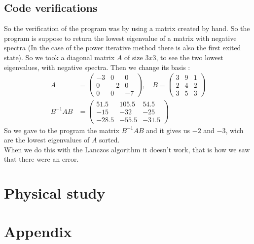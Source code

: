 \documentclass[1pt, a4paper]{article}
\begin{document}
\subsection{Code verifications}
\label{sub:verif}
So the verification of the program was by using a matrix created by hand. So the program is suppose to return the lowest eigenvalue of a matrix with negative spectra (In the case of the power iterative method there is also the first exited state).  So we took a diagonal matrix $A$ of size $3x3$, to see the two lowest eigenvalues, with negative spectra. Then we change its basis :
\begin{equation}
    \begin{aligned}
        A &= \begin{pmatrix}
            -3 & 0 & 0\\
            0 & -2 & 0 \\
            0 & 0 & -7
        \end{pmatrix},\quad B = \begin{pmatrix}
                                3 & 9 & 1\\
                                2&4&2\\
                                3&5&3
                            \end{pmatrix}\\
        B^{-1}AB &= \begin{pmatrix}
                        51.5&105.5&54.5\\
                        -15&-32&-25\\
                        -28.5&-55.5&-31.5
                    \end{pmatrix}
    \end{aligned}
\end{equation}
So we gave to the program the matrix $B^{-1}AB$ and it gives us $-2$ and $-3$, wich are the lowest eigenvalues of $A$ sorted.\\
When we do this with the Lanczos algorithm it doesn't work, that is how we saw that there were an error.
\section{Physical study}
\label{sec:study}
\noindent

\newpage
\section{Appendix}
\label{app:app}
\end{document}

